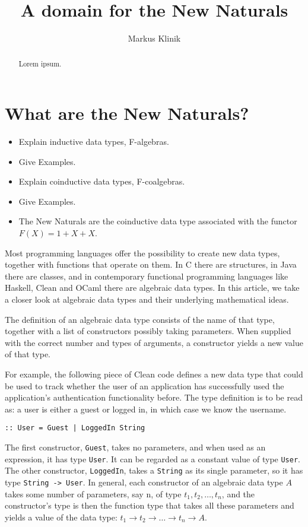 \documentclass[a4paper]{article}
\newcommand{\arr}{\rightarrow}
\begin{document}
\title{A domain for the New Naturals}
\author{Markus Klinik}
\maketitle

\begin{abstract}
Lorem ipsum.
\end{abstract}

\section{What are the New Naturals?}


\begin{itemize}
\item Explain inductive data types, F-algebras.
\item Give Examples.
\item Explain coinductive data types, F-coalgebras.
\item Give Examples.
\item The New Naturals are the coinductive data type associated with the
functor $F(X) = 1 + X + X$.
\end{itemize}


Most programming languages offer the possibility to create new data types,
together with functions that operate on them.  In C there are structures, in
Java there are classes, and in contemporary functional programming languages
like Haskell, Clean and OCaml there are algebraic data types.  In this article,
we take a closer look at algebraic data types and their underlying mathematical
ideas.

The definition of an algebraic data type consists of the name of that type,
together with a list of constructors possibly taking parameters.  When supplied
with the correct number and types of arguments, a constructor yields a new
value of that type.

For example, the following piece of Clean code defines a new data type that
could be used to track whether the user of an application has successfully used
the application's authentication functionality before.  The type definition is
to be read as: a user is either a guest or logged in, in which case we know the
username.

\begin{verbatim}
:: User = Guest | LoggedIn String
\end{verbatim}

The first constructor, \verb+Guest+, takes no parameters, and when used as an
expression, it has type \verb+User+.  It can be regarded as a constant value of
type \verb+User+.  The other constructor, \verb+LoggedIn+, takes a
\verb+String+ as its single parameter, so it has type \verb+String -> User+.
In general, each constructor of an algebraic data type $A$ takes some number of
parameters, say n, of type $t_1, t_2, \ldots, t_n$, and the constructor's type
is then the function type that takes all these parameters and yields a value of
the data type: $t_1 \arr t_2 \arr \ldots \arr t_n \arr A$.
\end{document}
